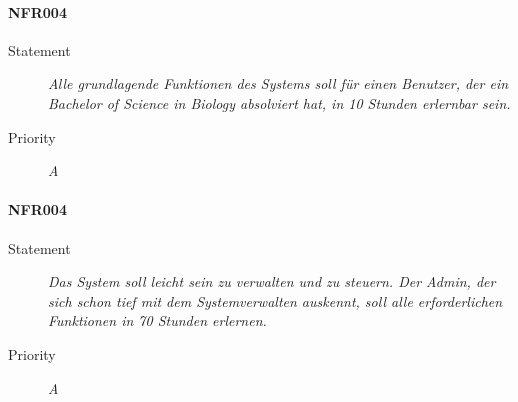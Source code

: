\paragraph{NFR004}
\begin{description}
\item[Statement] \textit{Alle grundlagende Funktionen des Systems soll für einen Benutzer, der ein Bachelor of Science in Biology absolviert hat, in 10 Stunden erlernbar sein.}
\item[Priority] \textit{A}
\end{description}

\paragraph{NFR004}
\begin{description}
\item[Statement] \textit{Das System soll leicht sein zu verwalten und zu steuern. Der Admin, der sich schon tief mit dem Systemverwalten auskennt, soll alle erforderlichen Funktionen in 70 Stunden erlernen.}
\item[Priority] \textit{A}
\end{description}